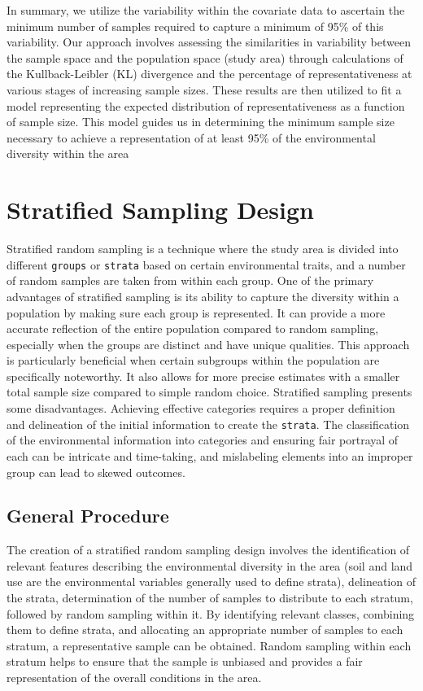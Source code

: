 \documentclass[
]{book}
\begin{document}
In summary, we utilize the variability within the covariate data to ascertain the minimum number of samples required to capture a minimum of 95\% of this variability. Our approach involves assessing the similarities in variability between the sample space and the population space (study area) through calculations of the Kullback-Leibler (KL) divergence and the percentage of representativeness at various stages of increasing sample sizes. These results are then utilized to fit a model representing the expected distribution of representativeness as a function of sample size. This model guides us in determining the minimum sample size necessary to achieve a representation of at least 95\% of the environmental diversity within the area

\hypertarget{stratified-sampling-design}{%
\chapter{Stratified Sampling Design}\label{stratified-sampling-design}}

Stratified random sampling is a technique where the study area is divided into different \texttt{groups} or \texttt{strata} based on certain environmental traits, and a number of random samples are taken from within each group. One of the primary advantages of stratified sampling is its ability to capture the diversity within a population by making sure each group is represented. It can provide a more accurate reflection of the entire population compared to random sampling, especially when the groups are distinct and have unique qualities. This approach is particularly beneficial when certain subgroups within the population are specifically noteworthy. It also allows for more precise estimates with a smaller total sample size compared to simple random choice. Stratified sampling presents some disadvantages. Achieving effective categories requires a proper definition and delineation of the initial information to create the \texttt{strata}. The classification of the environmental information into categories and ensuring fair portrayal of each can be intricate and time-taking, and mislabeling elements into an improper group can lead to skewed outcomes.

\hypertarget{general-procedure}{%
\section{General Procedure}\label{general-procedure}}

The creation of a stratified random sampling design involves the identification of relevant features describing the environmental diversity in the area (soil and land use are the environmental variables generally used to define strata), delineation of the strata, determination of the number of samples to distribute to each stratum, followed by random sampling within it. By identifying relevant classes, combining them to define strata, and allocating an appropriate number of samples to each stratum, a representative sample can be obtained. Random sampling within each stratum helps to ensure that the sample is unbiased and provides a fair representation of the overall conditions in the area.
\end{document}
